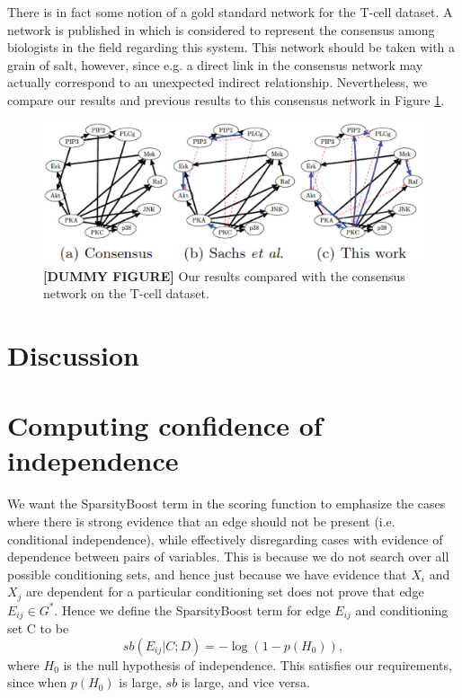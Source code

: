 \documentclass{article} %
\begin{document}
There is in fact some notion of a gold standard network for the T-cell dataset.  A network is published in \cite{sachs2005causal} which is considered to represent the consensus among biologists in the field regarding this system.  This network should be taken with a grain of salt, however, since e.g. a direct link in the consensus network may actually correspond to an unexpected  indirect relationship.  Nevertheless, we compare our results and previous results to this consensus network in Figure \ref{fig:sachs}.

\begin{figure}[h]
\centering
\includegraphics[width=1.1\linewidth]{img/dummy_sachs.eps} 
\caption{{\bf[DUMMY FIGURE]} Our results compared with the consensus network on the T-cell dataset.}
\label{fig:sachs}
\end{figure}


\section{Discussion}

\appendix
\section{Computing confidence of independence}
We want the SparsityBoost term in the scoring function to emphasize the cases where there is strong evidence that an edge should not be present (i.e. conditional independence), while effectively disregarding cases with evidence of dependence between pairs of variables.  This is because we do not search over all possible conditioning sets, and hence just because we have evidence that $X_i$ and $X_j$ are dependent for a particular conditioning set does not prove that edge $E_{ij} \in G^*$.  Hence we define the SparsityBoost term for edge $E_{ij}$ and conditioning set C to be $$sb(E_{ij} | C; D) = -\log(1 - p(H_0)),$$ where $H_0$ is the null hypothesis of independence.  This satisfies our requirements, since when $p(H_0)$ is large, $sb$ is large, and vice versa.
\end{document}
